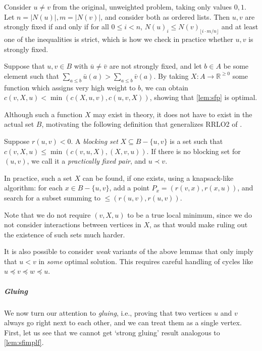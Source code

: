 \documentclass[a4paper,UKenglish,cleveref, autoref, thm-restate]{lipics-v2021}
\renewcommand{\b}{\prec}
\newcommand{\be}{\preceq}
\begin{document}
\begin{remark}
    Consider $u \neq v$ from the original, unweighted problem, taking only values $0, 1$. Let 
    $n = |N(u)|, m = |N(v)|$, and consider both as ordered lists. Then $u, v$ are strongly
    fixed if and only if for all $0 \leq i < n$, $N(u)_i \leq N(v)_{\lfloor i\cdot m/n
    \rfloor}$ and at least one of the inequalities is strict, which is how we check in practice whether $u, v$ is strongly fixed.
\end{remark}

\begin{remark}\label{rem:strongest}
    Suppose that $u, v \in B$ with $\bar u \neq \bar v$ are not strongly fixed, and let $b \in
    A$ be some element such
    that $\sum_{a \leq b} \bar u(a) > \sum_{a \leq b} \bar v(a)$. By taking $X: A \to \mathbb
    R^{\geq 0}$ some function which assigns very high
    weight to $b$, we can obtain $c(v, X, u) < \min(c(X, u, v), c(u, v, X))$, showing that
    \cref{lem:sfp} is optimal.
\end{remark}
Although such a function $X$ may exist in theory, it does
not have to exist in the actual set $B$, motivating the following definition
that generalizes RRLO2 of \cite{dujmovic_2008}.

\begin{lemma}\label{pfp}
  Suppose $r(u,v)< 0$.
    A \emph{blocking set} $X\subseteq B-\{u,v\}$ is a set such that $c(v,X,u) \leq \min(c(v, u,
    X), (X, v, u))$.  If there is no blocking set for $(u, v)$, we call it a
    \emph{practically fixed pair}, and $u\b v$.
\end{lemma}

In practice, such a set $X$ can be found, if one exists, using a knapsack-like algorithm: for
each $x\in B-\{u,v\}$, add a point $P_x = (r(v, x), r(x, u))$, and search for a subset summing
to ${\leq{}(r(u, v), r(u, v))}$.

Note that we do not require $(v, X, u)$ to be a true local minimum, since we do
not consider interactions between vertices in $X$, as that would make ruling out the
existence of such sets much harder.

\begin{remark}
  It is also possible to consider \emph{weak} variants of the above lemmas that
  only imply that $u < v$ in \emph{some} optimal solution. This requires careful
  handling of cycles like $u\be v\be w\be u$.
\end{remark}

\subparagraph{Gluing}
We now turn our attention to \emph{gluing}, i.e., proving that two vertices $u$
and $v$ always go right next to each other, and we can treat them as a single vertex. First,
let us see that we cannot get `strong gluing' result analogous to \cref{lem:sfimplf}.
\end{document}
